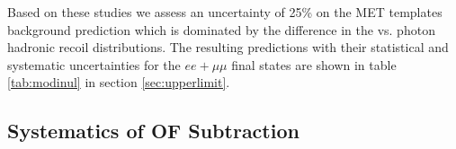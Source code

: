 \newcommand{\systpercentage}{25\% }

Based on these studies we assess an uncertainty of \systpercentage
on the MET templates background prediction
which is dominated by the difference in the \Z vs. photon hadronic recoil \pt distributions.
The resulting predictions with their statistical and systematic uncertainties for the $ee+\mu\mu$ 
final states are shown in table \ref{tab:modinul} in section \ref{sec:upperlimit}.

\subsection{Systematics of OF Subtraction}
\label{sec:systematicsof}

\newcommand{\ofsystpercentage}{20\% }

